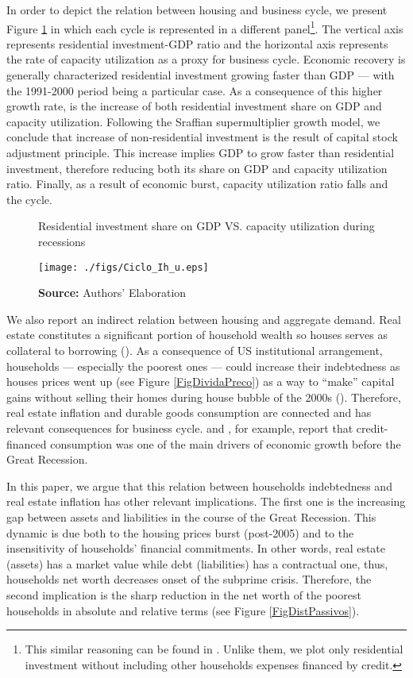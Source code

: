 In order to depict the relation between housing and business cycle, we present Figure \ref{FigIh_u}  in which each cycle is represented in a different panel\footnote{This similar reasoning can be found in \textcites{fiebiger_trend_2017}. Unlike them, we plot only residential investment without including other households expenses financed by credit.}. 
The vertical axis represents residential investment-GDP ratio and the horizontal
axis represents the rate of capacity utilization as a proxy for business cycle.
Economic recovery is generally characterized residential investment growing faster than GDP --- with the 1991-2000 period being a particular case. 
As a consequence of this higher growth rate, is the increase of both residential investment share on GDP and capacity utilization. 
Following the Sraffian supermultiplier growth model, we conclude that increase of non-residential investment is the result of capital stock adjustment principle.
This increase implies GDP to grow faster than residential investment, therefore reducing both its share on GDP and capacity utilization ratio. 
Finally, as a result of economic burst, capacity utilization ratio falls and the cycle.


\begin{figure}[H]
	\centering
	\caption{Residential investment share on GDP VS. capacity utilization during recessions}
	\label{FigIh_u}
	\texttt{[image: ./figs/Ciclo\_Ih\_u.eps]}
	\caption*{\textbf{Source:} Authors' Elaboration}
\end{figure}

We also report an indirect relation between housing and aggregate demand. 
Real estate constitutes a significant portion of household wealth so houses serves as collateral to borrowing (\cite{teixeira_uma_2011}). 
As a consequence of US institutional arrangement, households --- especially the poorest ones --- could increase their indebtedness as houses prices went up (see Figure \ref{FigDividaPreco}) as a way to ``make'' capital gains without %
selling their homes during house bubble of the 2000s (\cite{teixeira_crescimento_2015}).
Therefore, real estate inflation and durable goods consumption are connected and has relevant consequences for business cycle.
\textcite{zezza_u.s._2008} and \textcite{barba_rising_2009}, for example, report that credit-financed consumption was one of the main drivers of economic growth before the Great Recession.


In this paper, we argue that this relation between households indebtedness and real estate inflation has other relevant implications.
The first one is the increasing gap between assets and liabilities in the course of the Great Recession.
This dynamic is due both to the housing prices burst (post-2005) and to the insensitivity of households' financial commitments.
In other words, real estate (assets) has a market value while debt (liabilities) has a contractual one, thus, households net worth decreases onset of the subprime crisis.
Therefore, the second implication is the sharp reduction in the net worth of the poorest households in absolute and relative terms (see Figure \ref{FigDistPassivos}).


